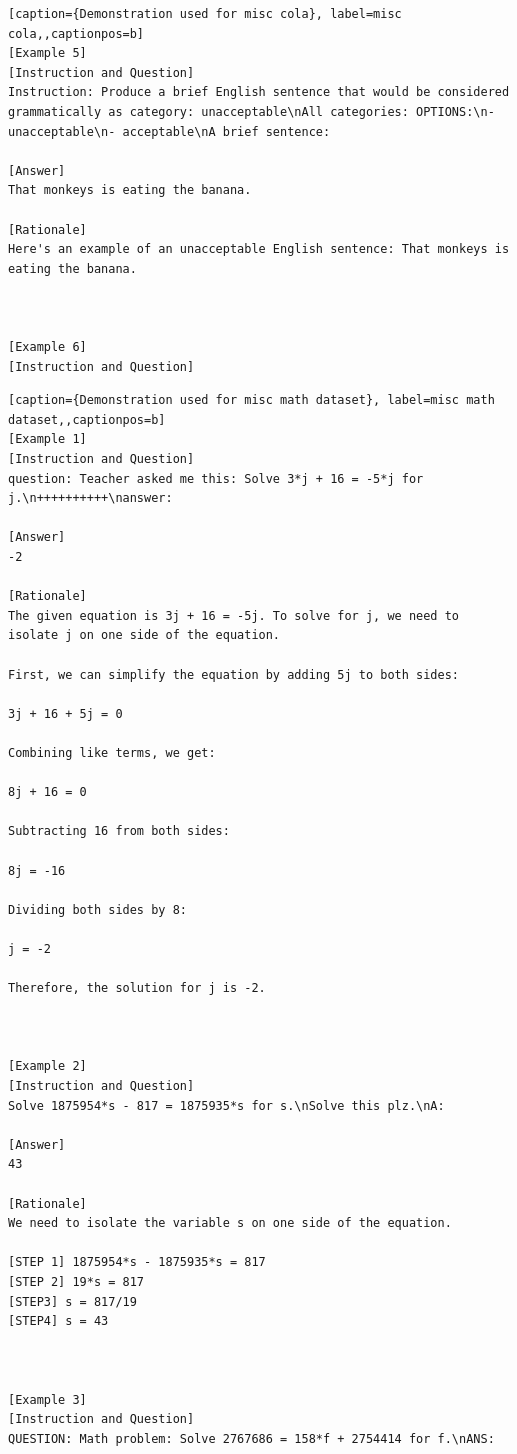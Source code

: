 \begin{lstlisting}[caption={Demonstration used for misc cola}, label=misc cola,,captionpos=b]
[Example 5]
[Instruction and Question]
Instruction: Produce a brief English sentence that would be considered grammatically as category: unacceptable\nAll categories: OPTIONS:\n- unacceptable\n- acceptable\nA brief sentence: 

[Answer]
That monkeys is eating the banana.

[Rationale]
Here's an example of an unacceptable English sentence: That monkeys is eating the banana.



[Example 6]
[Instruction and Question]

    \end{lstlisting}
    




\begin{lstlisting}[caption={Demonstration used for misc math dataset}, label=misc math dataset,,captionpos=b]
[Example 1]
[Instruction and Question]
question: Teacher asked me this: Solve 3*j + 16 = -5*j for j.\n++++++++++\nanswer:

[Answer]
-2

[Rationale]
The given equation is 3j + 16 = -5j. To solve for j, we need to isolate j on one side of the equation.

First, we can simplify the equation by adding 5j to both sides:

3j + 16 + 5j = 0

Combining like terms, we get:

8j + 16 = 0

Subtracting 16 from both sides:

8j = -16

Dividing both sides by 8:

j = -2

Therefore, the solution for j is -2.



[Example 2]
[Instruction and Question]
Solve 1875954*s - 817 = 1875935*s for s.\nSolve this plz.\nA:

[Answer]
43

[Rationale]
We need to isolate the variable s on one side of the equation.

[STEP 1] 1875954*s - 1875935*s = 817
[STEP 2] 19*s = 817
[STEP3] s = 817/19
[STEP4] s = 43



[Example 3]
[Instruction and Question]
QUESTION: Math problem: Solve 2767686 = 158*f + 2754414 for f.\nANS:


\end{lstlisting}
